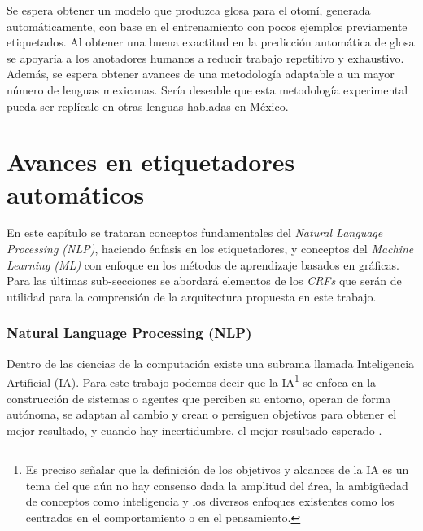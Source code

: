 \documentclass[letterpaper,12pt,oneside]{book}
\theoremstyle{definition}
\begin{document}
Se espera obtener un modelo que produzca glosa para el otomí, generada automáticamente, con base en el entrenamiento con pocos ejemplos previamente etiquetados. Al obtener una buena exactitud en la predicción automática de glosa se apoyaría a los anotadores humanos a reducir trabajo repetitivo y exhaustivo. Además, se espera obtener avances de una metodología adaptable a un mayor número de lenguas mexicanas. Sería deseable que esta metodología experimental pueda ser replícale en otras lenguas habladas en México.

\chapter{Avances en etiquetadores automáticos}\label{sec:marco}


En este capítulo se trataran conceptos fundamentales del \textit{Natural Language Processing (NLP)}, haciendo énfasis en los etiquetadores, y conceptos del \textit{ Machine Learning (ML)} con enfoque en los métodos de aprendizaje basados en gráficas. Para las últimas sub-secciones se abordará elementos de los \textit{CRFs} que serán de utilidad para la comprensión de la arquitectura propuesta en este trabajo.



\subsection{Natural Language Processing (NLP)}

Dentro de las ciencias de la computación existe una subrama llamada Inteligencia Artificial (IA). Para este trabajo podemos decir que la IA\footnote{Es preciso señalar que la definición de los objetivos y alcances de la IA es un tema del que aún no hay consenso dada la amplitud del área, la ambigüedad de conceptos como inteligencia y los diversos enfoques existentes como los centrados en el comportamiento o en el pensamiento.} se enfoca en la construcción de sistemas o agentes que perciben su entorno, operan de forma autónoma, se adaptan al cambio y crean o persiguen objetivos para obtener el mejor resultado, y cuando hay incertidumbre, el mejor resultado esperado \citep{russell2010artificial}.

\end{document}
